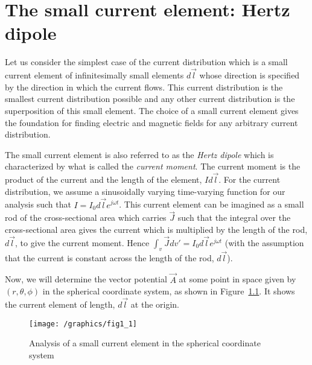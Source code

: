 \chapter{The small current element: Hertz dipole}
Let us consider the simplest case of the current distribution which is a small current element of infinitesimally small elements $d\vec{l}$ whose direction is specified by the direction in which the current flows. This current distribution is the smallest current distribution possible and any other current distribution is the superposition of this small element. The choice of a small current element gives the foundation for finding electric and magnetic fields for any arbitrary current distribution.

The small current element is also referred to as the \emph{Hertz dipole} which is characterized by what is called the \emph{current moment}. The current moment is the product of the current and the length of the element, $Id\vec{l}$. For the current distribution, we assume a sinusoidally varying time-varying function for our analysis such that $I = I_0d\vec{l}e^{j\omega t}$. This current element can be imagined as a small rod of the cross-sectional area which carries $\vec{J}$ such that the integral over the cross-sectional area gives the current which is multiplied by the length of the rod, $d\vec{l}$, to give the current moment. Hence $\int_v\vec{J}dv' = I_0d\vec{l}e^{j\omega t}$ (with the assumption that the current is constant across the length of the rod, $d\vec{l}$). 

Now, we will determine the vector potential $\vec{A}$ at some point in space given by $(r, \theta, \phi)$ in the spherical coordinate system, as shown in Figure~\ref{fig:small_current_element}. It shows the current element of length, $d\vec{l}$ at the origin.
\begin{figure}[h]
\texttt{[image: /graphics/fig1\_1]}
\centering
\caption{Analysis of a small current element in the spherical coordinate system}
\label{fig:small_current_element}
\end{figure}

